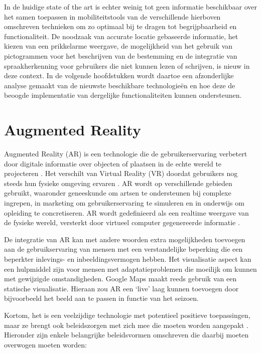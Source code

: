 In de huidige state of the art is echter weinig tot geen informatie beschikbaar over het samen toepassen in mobiliteitstools van de verschillende hierboven omschreven technieken om zo optimaal bij te dragen tot begrijpbaarheid en functionaliteit. De noodzaak van accurate locatie gebaseerde informatie, het kiezen van een prikkelarme weergave, de mogelijkheid van het gebruik van pictogrammen voor het beschrijven van de bestemming en de integratie van spraakherkenning voor gebruikers die niet kunnen lezen of schrijven, is nieuw in deze context. In de volgende hoofdstukken wordt daartoe een afzonderlijke analyse gemaakt van de nieuwste beschikbare technologieën en hoe deze de beoogde implementatie van dergelijke functionaliteiten kunnen ondersteunen. 


\section{Augmented Reality}
\label{sec:augmented-reality}

Augmented Reality (AR) is een technologie die de gebruikerservaring verbetert door digitale informatie over objecten of plaatsen in de echte wereld te projecteren \autocite{Berryman2012}. Het verschilt van Virtual Reality (VR) doordat gebruikers nog steeds hun fysieke omgeving ervaren \autocite{Calo2015}. AR wordt op verschillende gebieden gebruikt, waaronder geneeskunde om artsen te ondersteunen bij complexe ingrepen, in marketing om gebruikerservaring te simuleren en in onderwijs om opleiding te concretiseren. AR wordt gedefinieerd als een realtime weergave van de fysieke wereld, versterkt door virtueel computer gegenereerde informatie \autocite{Carmigniani2011}. 

De integratie van AR kan met andere woorden extra mogelijkheden toevoegen aan de gebruikservaring van mensen met een verstandelijke beperking die een beperkter inlevings- en inbeeldingsvermogen hebben. Het visualisatie aspect kan een hulpmiddel zijn voor mensen met adaptatieproblemen die moeilijk om kunnen met gewijzigde omstandigheden. Google Maps maakt reeds gebruik van een statische visualisatie. Hieraan zou AR een `live' laag kunnen toevoegen door bijvoorbeeld het beeld aan te passen in functie van het seizoen.

Kortom, het is een veelzijdige technologie met potentieel positieve toepassingen, maar ze brengt ook beleidszorgen met zich mee die moeten worden aangepakt \autocite{Calo2015}. Hieronder zijn enkele belangrijke beleidsvormen omschreven die daarbij moeten overwogen moeten worden:  

